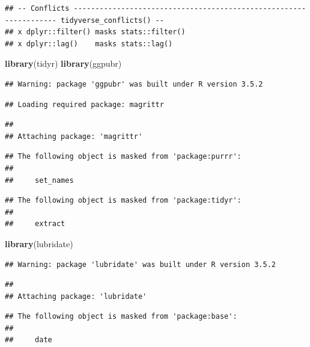 \documentclass[]{article}
\newenvironment{Shaded}{\begin{snugshade}}{\end{snugshade}}
\newcommand{\KeywordTok}[1]{\textcolor[rgb]{0.13,0.29,0.53}{\textbf{#1}}}
\newcommand{\NormalTok}[1]{#1}
\begin{document}
\begin{verbatim}
## -- Conflicts ------------------------------------------------------------------ tidyverse_conflicts() --
## x dplyr::filter() masks stats::filter()
## x dplyr::lag()    masks stats::lag()
\end{verbatim}

\begin{Shaded}
\begin{Highlighting}[]
\KeywordTok{library}\NormalTok{(tidyr)}
\KeywordTok{library}\NormalTok{(ggpubr)}
\end{Highlighting}
\end{Shaded}

\begin{verbatim}
## Warning: package 'ggpubr' was built under R version 3.5.2
\end{verbatim}

\begin{verbatim}
## Loading required package: magrittr
\end{verbatim}

\begin{verbatim}
## 
## Attaching package: 'magrittr'
\end{verbatim}

\begin{verbatim}
## The following object is masked from 'package:purrr':
## 
##     set_names
\end{verbatim}

\begin{verbatim}
## The following object is masked from 'package:tidyr':
## 
##     extract
\end{verbatim}

\begin{Shaded}
\begin{Highlighting}[]
\KeywordTok{library}\NormalTok{(lubridate)}
\end{Highlighting}
\end{Shaded}

\begin{verbatim}
## Warning: package 'lubridate' was built under R version 3.5.2
\end{verbatim}

\begin{verbatim}
## 
## Attaching package: 'lubridate'
\end{verbatim}

\begin{verbatim}
## The following object is masked from 'package:base':
## 
##     date
\end{verbatim}
\end{document}
